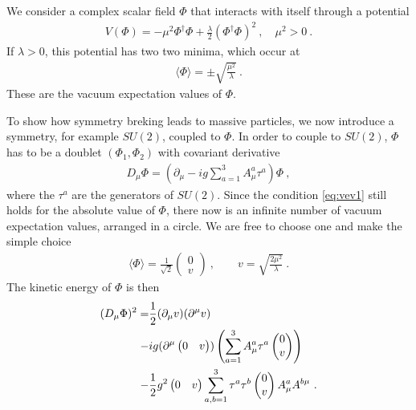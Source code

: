 We consider a complex scalar field $\Phi$ that interacts with itself through a potential
\begin{align}
	V(\Phi) = -\mu^2\Phi^\dagger\Phi + \frac{\lambda}{2}(\Phi^\dagger\Phi)^2 \ , \quad \mu^2 > 0 \ .
\end{align}
If $\lambda>0$, this potential has two two minima, which occur at
\begin{align}\label{eq:vev1}
	\langle\Phi\rangle =  \pm\sqrt{\frac{\mu^2}{\lambda}} \ .
\end{align}
These are the vacuum expectation values of $\Phi$.

To show how symmetry breking leads to massive particles, we now introduce a symmetry, for example $SU(2)$, coupled to $\Phi$. In order to couple to $SU(2)$, $\Phi$ has to be a doublet $(\Phi_1,\Phi_2)$ with covariant derivative
\begin{align}
	D_\mu\Phi = (\partial_\mu - ig\sum_{a=1}^3A_\mu^a\tau^a)\Phi \ ,
\end{align}
where the $\tau^a$ are the generators of $SU(2)$. Since the condition \ref{eq:vev1} still holds for the absolute value of $\Phi$, there now is an infinite number of vacuum expectation values, arranged in a circle. We are free to choose one and make the simple choice
\begin{align}\label{eq:vev2}
	\langle\Phi\rangle = \frac{1}{\sqrt{2}}\begin{pmatrix} 0 \\ v \end{pmatrix} \ , \qquad v = \sqrt{\frac{2\mu^2}{\lambda}} \ .
\end{align}
The kinetic energy of $\Phi$ is then
\begin{align}\label{eq:Ekin}
	(D_\mu\Phi)^2 = &\frac{1}{2}(\partial_\mu v)(\partial^\mu v)\notag \\
	- &ig(\partial^\mu\begin{pmatrix} 0 & v \end{pmatrix}) \left(\sum_{a=1}^3A_\mu^a\tau^a\begin{pmatrix} 0 \\ v \end{pmatrix}\right)\notag \\
	- &\frac{1}{2}g^2\begin{pmatrix} 0 & v \end{pmatrix}\sum_{a,b=1}^{3}\tau^a\tau^b\begin{pmatrix} 0 \\ v \end{pmatrix}A_\mu^aA^{b\mu} \ .
\end{align}
